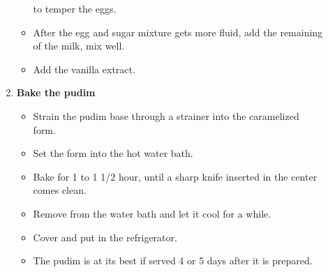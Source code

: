 \documentclass [11pt, letterpaper] {article}
\newcommand \fileName {PudimDeLeite}
\begin{document}
\begin{description}
\begin{enumerate}
\begin{itemize}
to temper the eggs.
	\item After the egg and sugar mixture gets more fluid, add the
remaining of the milk, mix well.
	\item Add the vanilla extract.
	\end{itemize}
	\item {\bf Bake the pudim}
	\begin{itemize}
	\item Strain the pudim base through a strainer into the
              caramelized form.
	\item Set the form into the hot water bath.
	\item Bake for 1 to 1 1/2 hour, until a sharp knife inserted in
              the center comes clean.
	\item Remove from the water bath and let it cool for a while.
	\item Cover and put in the refrigerator.
	\item The pudim is at its best if served 4 or 5 days after it
	      is prepared.
	\end{itemize}
	\end{enumerate}
\end{description}


\end{document}
